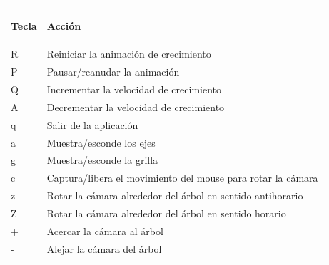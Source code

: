 \documentclass[11pt]{article}
\begin{document}
    \begin{tabular}{|| l | l ||}
      \hline
      \begin{large}Tecla\end{large} & 
	\begin{large}Acci\'{o}n \end{large} \\
          \hline
R & Reiniciar la animaci\'on de crecimiento \\
P & Pausar/reanudar la animaci\'on  \\
Q & Incrementar la velocidad de crecimiento  \\
A & Decrementar la velocidad de crecimiento  \\
q & Salir de la aplicaci\'on  \\
a & Muestra/esconde los ejes  \\
g & Muestra/esconde la grilla  \\
c & Captura/libera el movimiento del mouse para rotar la c\'amara  \\
z & Rotar la c\'amara alrededor del \'arbol en sentido antihorario  \\
Z & Rotar la c\'amara alrededor del \'arbol en sentido horario  \\
+ & Acercar la c\'amara al \'arbol  \\
- & Alejar la c\'amara del \'arbol  \\

          \hline
    \end{tabular}
\end{document}
